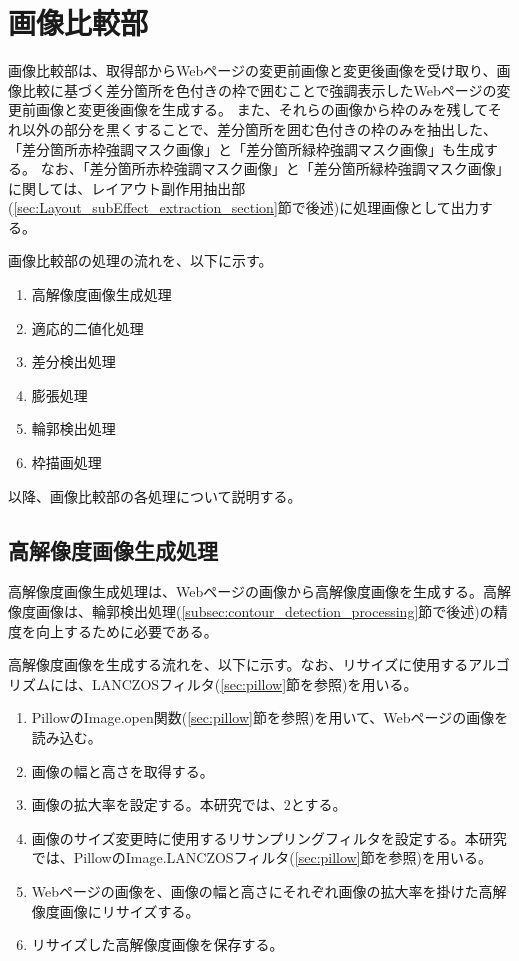 \section{画像比較部}\label{sec:Difference_extraction_section}
画像比較部は、取得部からWebページの変更前画像と変更後画像を受け取り、画像比較に基づく差分箇所を色付きの枠で囲むことで強調表示したWebページの変更前画像と変更後画像を生成する。
また、それらの画像から枠のみを残してそれ以外の部分を黒くすることで、差分箇所を囲む色付きの枠のみを抽出した、「差分箇所赤枠強調マスク画像」と「差分箇所緑枠強調マスク画像」も生成する。
なお、「差分箇所赤枠強調マスク画像」と「差分箇所緑枠強調マスク画像」に関しては、レイアウト副作用抽出部(\ref{sec:Layout_subEffect_extraction_section}節で後述)に処理画像として出力する。
\par
画像比較部の処理の流れを、以下に示す。
\begin{enumerate}
    \item 高解像度画像生成処理
    \item 適応的二値化処理
    \item 差分検出処理
    \item 膨張処理
    \item 輪郭検出処理
    \item 枠描画処理
\end{enumerate}
以降、画像比較部の各処理について説明する。

\subsection{高解像度画像生成処理}\label{subsec:Generate_high_images}
高解像度画像生成処理は、Webページの画像から高解像度画像を生成する。高解像度画像は、輪郭検出処理(\ref{subsec:contour_detection_processing}節で後述)の精度を向上するために必要である。
\par
高解像度画像を生成する流れを、以下に示す。なお、リサイズに使用するアルゴリズムには、LANCZOSフィルタ(\ref{sec:pillow}節を参照)を用いる。
\begin{enumerate}
    \item PillowのImage.open関数(\ref{sec:pillow}節を参照)を用いて、Webページの画像を読み込む。
    \item 画像の幅と高さを取得する。
    \item 画像の拡大率を設定する。本研究では、$2$とする。
    \item 画像のサイズ変更時に使用するリサンプリングフィルタを設定する。本研究では、PillowのImage.LANCZOSフィルタ(\ref{sec:pillow}節を参照)を用いる。
    \item Webページの画像を、画像の幅と高さにそれぞれ画像の拡大率を掛けた高解像度画像にリサイズする。
    \item リサイズした高解像度画像を保存する。
\end{enumerate}

